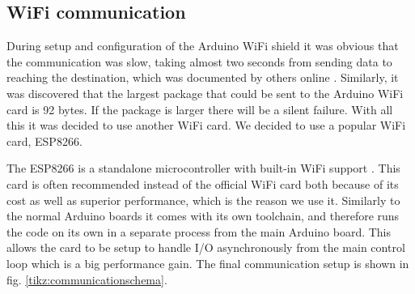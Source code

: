 \documentclass[11pt]{article}
\begin{document}
\subsection{WiFi communication}
During setup and configuration of the Arduino WiFi shield it was obvious that
the communication was  slow, taking almost two seconds from sending data to
reaching the destination, which was documented by others online
\cite{wificard1,wificard2}. Similarly, it was discovered that the largest
package that could be sent to the Arduino WiFi card is 92 bytes. If the package
is larger there will be a silent failure. With all this it was decided to use
another WiFi card. We decided to use a  popular WiFi card, ESP8266. \par

The ESP8266 is a standalone microcontroller with built-in WiFi support
\cite{ESP8266}. This card is often recommended instead of the official WiFi card
both because of its cost as well as superior performance, which is the reason we
use it. Similarly to the normal Arduino boards it comes with its own toolchain,
and therefore runs the code on its own in a separate process from the main
Arduino board. This allows the card to be setup to handle I/O asynchronously
from the main control loop which is a big performance gain. The final
communication setup is shown in fig. \vref{tikz:communicationschema}.\par
\end{document}
